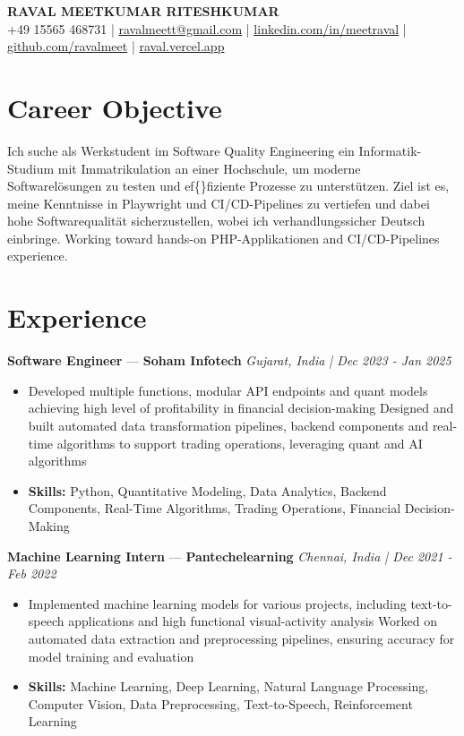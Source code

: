 \documentclass[a4paper,10pt]{article}
\begin{document}
\begin{center}
  {\Large\bfseries RAVAL MEETKUMAR RITESHKUMAR}\\[2pt]
  {\small +49 15565 468731 \;|\; \href{mailto:ravalmeett@gmail.com}{ravalmeett@gmail.com} \;|\; \href{https://www.linkedin.com/in/meetraval/}{linkedin.com/in/meetraval} \;|\; \href{https://github.com/ravalmeet}{github.com/ravalmeet} \;|\; \href{https://raval.vercel.app/}{raval.vercel.app}}
\end{center}
\vspace{-3pt}

\section*{Career Objective}
Ich suche als Werkstudent im Software Quality Engineering ein Informatik-Studium mit Immatrikulation an einer Hochschule, um moderne Softwarelösungen zu testen und ef\{\}fiziente Prozesse zu unterstützen. Ziel ist es, meine Kenntnisse in Playwright und CI/CD-Pipelines zu vertiefen und dabei hohe Softwarequalität sicherzustellen, wobei ich verhandlungssicher Deutsch einbringe. Working toward hands-on PHP-Applikationen and CI/CD-Pipelines experience.\par

\section*{Experience}
\textbf{Software Engineer} — \textbf{Soham Infotech} \hfill \textit{Gujarat, India \;|\; Dec 2023 - Jan 2025}\par
\vspace{1pt}
\begin{itemize}
  \item Developed multiple functions, modular API endpoints and quant models achieving high level of profitability in financial decision-making Designed and built automated data transformation pipelines, backend components and real-time algorithms to support trading operations, leveraging quant and AI algorithms
  \item \textbf{Skills:} Python, Quantitative Modeling, Data Analytics, Backend Components, Real-Time Algorithms, Trading Operations, Financial Decision-Making
\end{itemize}
\vspace{3pt}
\textbf{Machine Learning Intern} — \textbf{Pantechelearning} \hfill \textit{Chennai, India \;|\; Dec 2021 - Feb 2022}\par
\vspace{1pt}
\begin{itemize}
  \item Implemented machine learning models for various projects, including text-to-speech applications and high functional visual-activity analysis Worked on automated data extraction and preprocessing pipelines, ensuring accuracy for model training and evaluation
  \item \textbf{Skills:} Machine Learning, Deep Learning, Natural Language Processing, Computer Vision, Data Preprocessing, Text-to-Speech, Reinforcement Learning
\end{itemize}
\end{document}
